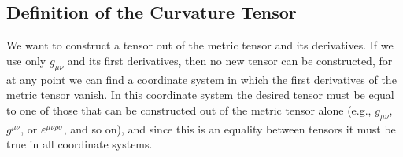 
\subsection{Definition of the Curvature Tensor}\label{sec:6.1}

We want to construct a tensor out of the metric tensor and its derivatives.
If we use only \(g_{\mu\nu}\) and its first derivatives, then no new tensor can
be constructed, for at any point we can find a coordinate system in which the
first derivatives of the metric tensor vanish. In this coordinate system the
desired tensor must be equal to one of those that can be constructed out of
the metric tensor alone (e.g., \(g_{\mu\nu}\), \(g^{\mu\nu}\), or
\(\varepsilon^{\mu\nu\rho\sigma}\), and so on), and since this is an
equality between tensors it must be true in all coordinate systems.

